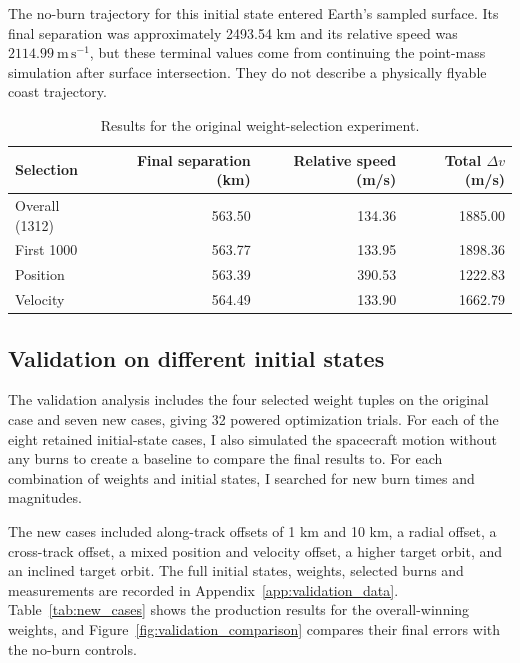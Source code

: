 \documentclass[11pt,letterpaper]{article}
\begin{document}
The no-burn trajectory for this initial state entered Earth's sampled
surface. Its final separation was approximately 2493.54 km and its
relative speed was $2114.99\ \mathrm{m\,s^{-1}}$, but these terminal
values come from continuing the point-mass simulation after surface
intersection. They do not describe a physically flyable coast trajectory.

\begin{table}[htbp]
\centering
\caption{Results for the original weight-selection experiment.}
\label{tab:selection_case}
\begin{tabular}{lrrr}
\toprule
Selection & Final separation (km) & Relative speed (m/s) & Total $\Delta v$ (m/s)\\
\midrule
Overall (1312) & 563.50 & 134.36 & 1885.00\\
First 1000 & 563.77 & 133.95 & 1898.36\\
Position & 563.39 & 390.53 & 1222.83\\
Velocity & 564.49 & 133.90 & 1662.79\\
\bottomrule
\end{tabular}
\end{table}

\subsection{Validation on different initial states}
The validation analysis includes the four selected weight tuples on the original case
and seven new cases, giving 32 powered optimization trials. For
each of the eight retained initial-state cases, I also simulated the spacecraft
motion without any burns to create a baseline to compare the final results
to. For each combination of weights and initial states, I searched for new
burn times and magnitudes.

The new cases included along-track offsets of 1 km and 10 km,
a radial offset, a cross-track offset, a mixed position and velocity
offset, a higher target orbit, and an inclined target orbit. The full
initial states, weights, selected burns and measurements are recorded
in Appendix~\ref{app:validation_data}. Table~\ref{tab:new_cases} shows
the production results for the overall-winning weights, and
Figure~\ref{fig:validation_comparison} compares their final errors
with the no-burn controls.
\end{document}
